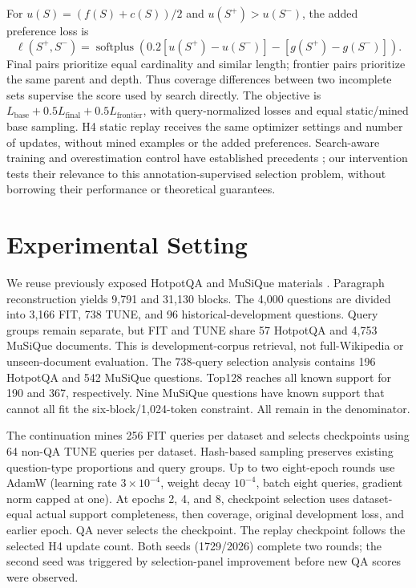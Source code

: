 \documentclass[runningheads]{llncs}
\begin{document}
For $u(S)=(f(S)+c(S))/2$ and $u(S^+)>u(S^-)$, the added preference loss is
\begin{equation}
\ell(S^+,S^-)=\operatorname{softplus}\!\left(
0.2[u(S^+)-u(S^-)]-[g(S^+)-g(S^-)]\right).
\end{equation}
Final pairs prioritize equal cardinality and similar length; frontier pairs
prioritize the same parent and depth. Thus coverage differences between two
incomplete sets supervise the score used by search directly. The objective
is $L_{\mathrm{base}}+0.5L_{\mathrm{final}}+0.5L_{\mathrm{frontier}}$,
with query-normalized losses and equal static/mined base sampling.
H4 static replay receives the same optimizer settings and number of updates,
without mined examples or the added preferences. Search-aware training and
overestimation control have established precedents
\cite{wiseman2016bso,trabucco2021com}; our intervention tests their relevance
to this annotation-supervised selection problem, without borrowing their
performance or theoretical guarantees.

\section{Experimental Setting}
We reuse previously exposed HotpotQA and MuSiQue materials
\cite{yang2018hotpotqa,trivedi2022musique}. Paragraph reconstruction yields
9,791 and 31,130 blocks. The 4,000 questions are divided into 3,166
FIT, 738 TUNE, and 96 historical-development questions. Query groups remain
separate, but FIT and TUNE share 57 HotpotQA and 4,753 MuSiQue documents.
This is development-corpus retrieval, not full-Wikipedia or unseen-document
evaluation. The 738-query selection analysis contains 196 HotpotQA and 542
MuSiQue questions. Top128 reaches all known support for 190 and 367,
respectively. Nine MuSiQue questions have known support that cannot all fit
the six-block/1,024-token constraint. All remain in the denominator.

The continuation mines 256 FIT queries per dataset and selects checkpoints
using 64 non-QA TUNE queries per dataset. Hash-based sampling preserves
existing question-type proportions and query groups. Up to two eight-epoch
rounds use AdamW (learning rate $3\times10^{-4}$, weight decay $10^{-4}$,
batch eight queries, gradient norm capped at one). At epochs 2, 4, and 8,
checkpoint selection uses dataset-equal actual support completeness, then
coverage, original development loss, and earlier epoch. QA never selects
the checkpoint. The replay checkpoint follows the selected H4 update count.
Both seeds (1729/2026) complete two rounds; the second seed was triggered
by selection-panel improvement before new QA scores were observed.
\end{document}
